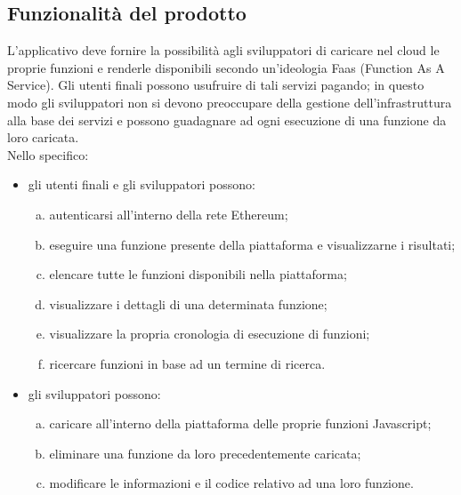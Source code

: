 \subsection{Funzionalità del prodotto}
L'applicativo deve fornire la possibilità agli sviluppatori di caricare nel cloud le proprie funzioni e renderle disponibili secondo un'ideologia Faas (Function As A Service). Gli utenti finali possono usufruire di tali servizi pagando; in questo modo gli sviluppatori non si devono preoccupare della gestione dell'infrastruttura alla base dei servizi e possono guadagnare ad ogni esecuzione di una funzione da loro caricata. \\
Nello specifico: 
	\begin{itemize}
		\item gli utenti finali e gli sviluppatori possono: 
		\begin{enumerate}[a.]
			\item autenticarsi all'interno della rete Ethereum; 
			\item eseguire una funzione presente della piattaforma e visualizzarne i risultati; 
			\item elencare tutte le funzioni disponibili nella piattaforma; 
			\item visualizzare i dettagli di una determinata funzione; 
			\item visualizzare la propria cronologia di esecuzione di funzioni; 
			\item ricercare funzioni in base ad un termine di ricerca. 
		\end{enumerate}
		
		\item gli sviluppatori possono: 
		\begin{enumerate}[a.]
			\item caricare all'interno della piattaforma delle proprie funzioni Javascript; 
			\item eliminare una funzione da loro precedentemente caricata; 
			\item modificare le informazioni e il codice relativo ad una loro funzione.
		\end{enumerate}
	\end{itemize}

